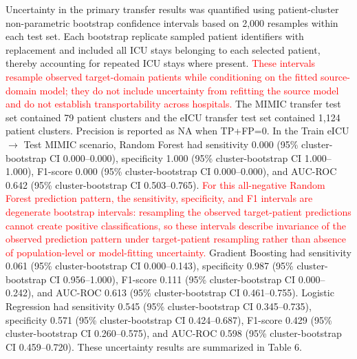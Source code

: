 \documentclass[utf8]{FrontiersinHarvard} %
\begin{document}
Uncertainty in the primary transfer results was quantified using patient-cluster non-parametric bootstrap confidence intervals based on 2,000 resamples within each test set. Each bootstrap replicate sampled patient identifiers with replacement and included all ICU stays belonging to each selected patient, thereby accounting for repeated ICU stays where present. \textcolor{red}{These intervals resample observed target-domain patients while conditioning on the fitted source-domain model; they do not include uncertainty from refitting the source model and do not establish transportability across hospitals.} The MIMIC transfer test set contained 79 patient clusters and the eICU transfer test set contained 1,124 patient clusters. Precision is reported as NA when TP+FP=0. In the Train eICU $\rightarrow$ Test MIMIC scenario, Random Forest had sensitivity 0.000 (95\% cluster-bootstrap CI 0.000--0.000), specificity 1.000 (95\% cluster-bootstrap CI 1.000--1.000), F1-score 0.000 (95\% cluster-bootstrap CI 0.000--0.000), and AUC-ROC 0.642 (95\% cluster-bootstrap CI 0.503--0.765). \textcolor{red}{For this all-negative Random Forest prediction pattern, the sensitivity, specificity, and F1 intervals are degenerate bootstrap intervals: resampling the observed target-patient predictions cannot create positive classifications, so these intervals describe invariance of the observed prediction pattern under target-patient resampling rather than absence of population-level or model-fitting uncertainty.} Gradient Boosting had sensitivity 0.061 (95\% cluster-bootstrap CI 0.000--0.143), specificity 0.987 (95\% cluster-bootstrap CI 0.956--1.000), F1-score 0.111 (95\% cluster-bootstrap CI 0.000--0.242), and AUC-ROC 0.613 (95\% cluster-bootstrap CI 0.461--0.755). Logistic Regression had sensitivity 0.545 (95\% cluster-bootstrap CI 0.345--0.735), specificity 0.571 (95\% cluster-bootstrap CI 0.424--0.687), F1-score 0.429 (95\% cluster-bootstrap CI 0.260--0.575), and AUC-ROC 0.598 (95\% cluster-bootstrap CI 0.459--0.720). These uncertainty results are summarized in Table 6.
\end{document}
